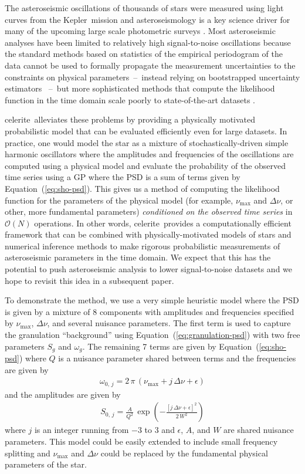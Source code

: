 \documentclass[manuscript, letterpaper]{aastex6}
\newcommand{\project}[1]{\textsf{#1}}
\newcommand{\kepler}{\project{Kepler}}
\newcommand{\celerite}{\project{celerite}}
\renewcommand{\eqref}[1]{\ref{eq:#1}}
\newcommand{\Eq}[1]{Equation~(\eqref{#1})}
\newcommand{\eq}[1]{\Eq{#1}}
\begin{document}
The asteroseismic oscillations of thousands of stars were measured using light
curves from the \kepler\ mission \citep{Gilliland:2010, Huber:2011,
Chaplin:2011, Chaplin:2013, Stello:2013} and asteroseismology is a key science
driver for many of the upcoming large scale photometric surveys
\citep{Campante:2016, Rauer:2014, Gould:2015}.
Most asteroseismic analyses have been limited to relatively high
signal-to-noise oscillations because the standard methods based on statistics
of the empirical periodogram of the data cannot be used to formally propagate
the measurement uncertainties to the constraints on physical
parameters~--~instead relying on bootstrapped uncertainty estimators
\citep{Huber:2009}~--~but more sophisticated methods that compute the
likelihood function in the time domain scale poorly to state-of-the-art
datasets \citep{Brewer:2009,Corsaro:2014}.

\celerite\ alleviates these problems by providing a physically motivated
probabilistic model that can be evaluated efficiently even for large datasets.
In practice, one would model the star as a mixture of stochastically-driven
simple harmonic oscillators where the amplitudes and frequencies of the
oscillations are computed using a physical model and evaluate the probability
of the observed time series using a GP where the PSD is a sum of terms given
by \eq{sho-psd}.
This gives us a method of computing the likelihood function for the parameters
of the physical model (for example, $\nu_\mathrm{max}$ and $\Delta \nu$, or
other, more fundamental parameters) \emph{conditioned on the observed time
series} in $\mathcal{O}(N)$ operations.
In other words, \celerite\ provides a computationally efficient framework that
can be combined with physically-motivated models of stars and numerical
inference methods to make rigorous probabilistic measurements of asteroseismic
parameters in the time domain.
We expect that this has the potential to push asteroseismic analysis to lower
signal-to-noise datasets and we hope to revisit this idea in a subsequent
paper.

To demonstrate the method, we use a very simple heuristic model where the PSD
is given by a mixture of 8 components with amplitudes and frequencies
specified by $\nu_\mathrm{max}$, $\Delta \nu$, and several nuisance
parameters.
The first term is used to capture the granulation ``background''
\citep{Kallinger:2014} using \eq{granulation-psd} with two free parameters
$S_g$ and $\omega_g$.
The remaining  7 terms are given by \eq{sho-psd} where $Q$ is a nuisance
parameter shared between terms and the frequencies are given by
\begin{eqnarray}
\omega_{0,\,j} = 2\,\pi\,(\nu_\mathrm{max} + j\,\Delta\nu + \epsilon)
\end{eqnarray}
and the amplitudes are given by
\begin{eqnarray}
S_{0,\,j} =
    \frac{A}{Q^2}\,\exp\left(-\frac{[j\,\Delta\nu + \epsilon]^2}{2\,W^2}\right)
\end{eqnarray}
where $j$ is an integer running from $-3$ to 3 and $\epsilon$, $A$, and $W$
are shared nuisance parameters.
This model could be easily extended to include small frequency splitting and
$\nu_\mathrm{max}$ and $\Delta \nu$ could be replaced by the fundamental
physical parameters of the star.
\end{document}
